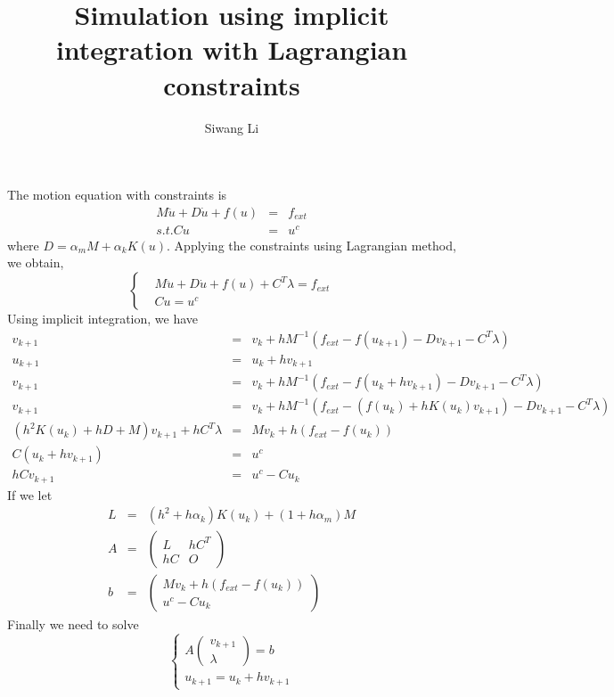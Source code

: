 \documentclass[9pt]{extarticle}
\author{Siwang Li}
\title{Simulation using implicit integration with Lagrangian constraints}
\begin{document}
\maketitle

\setlength{\parskip}{0.5ex}

The motion equation with constraints is
\begin{eqnarray}
 M\ddot{u} + D\dot{u} + f(u) &=& f_{ext} \\
 s.t. Cu &=& u^c
\end{eqnarray}
where $D=\alpha_mM+\alpha_kK(u)$. Applying the constraints using Lagrangian method, we obtain,
\begin{equation}
  \left\{ \begin{array}{rl}
      &M\ddot{u} + D\dot{u} + f(u) + C^T\lambda= f_{ext} \\
      &Cu=u^c
    \end{array} \right.
\end{equation}
Using implicit integration, we have
\begin{eqnarray}
 v_{k+1} &=& v_k + hM^{-1}(f_{ext}-f(u_{k+1})-Dv_{k+1}-C^T\lambda) \\
 u_{k+1} &=& u_{k} + hv_{k+1}\\
 v_{k+1} &=& v_k + hM^{-1}(f_{ext}-f(u_{k} + hv_{k+1})-Dv_{k+1}-C^T\lambda) \\
 v_{k+1} &=& v_k + hM^{-1}(f_{ext}-(f(u_{k})+hK(u_{k})v_{k+1})-Dv_{k+1}-C^T\lambda) \\
 (h^2K(u_{k})+hD+M)v_{k+1}+hC^T\lambda &=& Mv_k + h(f_{ext}-f(u_{k}))\\
 C(u_{k}+hv_{k+1}) &=& u^c\\
 hCv_{k+1} &=& u^c-Cu_{k}
\end{eqnarray}
If we let 
\begin{eqnarray}
 L &=& (h^2+h\alpha_k)K(u_{k})+(1+h\alpha_m)M\\
 A  &=& \left( \begin{array}{cc}
     L & hC^T\\
     hC & O
   \end{array} \right)\\
 b &=& \left( \begin{array}{c}
     Mv_k + h(f_{ext}-f(u_{k}))\\
     u^c-Cu_k
   \end{array} \right)
\end{eqnarray}
Finally we need to solve
\begin{equation}
  \left\{ \begin{array}{rl}
      A \left( \begin{array}{c}
          v_{k+1}\\
          \lambda
        \end{array} \right) = 
      b\\
      u_{k+1} = u_{k} + hv_{k+1}
    \end{array} \right.
\end{equation}
\end{document}
